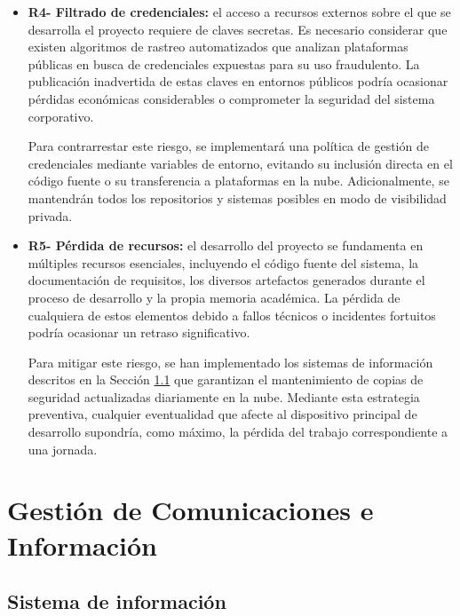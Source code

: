 \begin{itemize}
\item\textbf{R4- Filtrado de credenciales: }el acceso a recursos externos sobre el que se desarrolla el proyecto requiere de claves secretas. Es necesario considerar que existen algoritmos de rastreo automatizados que analizan plataformas públicas en busca de credenciales expuestas para su uso fraudulento. La publicación inadvertida de estas claves en entornos públicos podría ocasionar pérdidas económicas considerables o comprometer la seguridad del sistema corporativo.

Para contrarrestar este riesgo, se implementará una política de gestión de credenciales mediante variables de entorno, evitando su inclusión directa en el código fuente o su transferencia a plataformas en la nube. Adicionalmente, se mantendrán todos los repositorios y sistemas posibles en modo de visibilidad privada.

\item\textbf{R5- Pérdida de recursos: }el desarrollo del proyecto se fundamenta en múltiples recursos esenciales, incluyendo el código fuente del sistema, la documentación de requisitos, los diversos artefactos generados durante el proceso de desarrollo y la propia memoria académica. La pérdida de cualquiera de estos elementos debido a fallos técnicos o incidentes fortuitos podría ocasionar un retraso significativo.

Para mitigar este riesgo, se han implementado los sistemas de información descritos en la Sección \ref{sec:sys_info} que garantizan el mantenimiento de copias de seguridad actualizadas diariamente en la nube. Mediante esta estrategia preventiva, cualquier eventualidad que afecte al dispositivo principal de desarrollo supondría, como máximo, la pérdida del trabajo correspondiente a una jornada.
\end{itemize}

\section{Gestión de Comunicaciones e Información}

\subsection{Sistema de información}\label{sec:sys_info}

